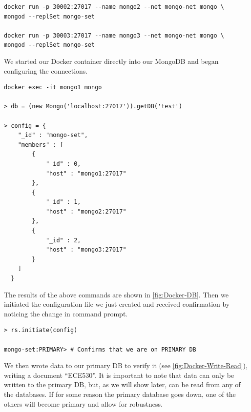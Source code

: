 \documentclass{article}
\begin{document}
\begin{tcolorbox}[colback=CrispBlue!5!white,colframe=CrispBlue!75!black,title=Create secondary MongoDB images]    
\begin{verbatim}    
docker run -p 30002:27017 --name mongo2 --net mongo-net mongo \
mongod --replSet mongo-set

docker run -p 30003:27017 --name mongo3 --net mongo-net mongo \
mongod --replSet mongo-set
\end{verbatim}
\end{tcolorbox}

\newpage

We started our Docker container directly into our MongoDB and began configuring the connections.
\begin{tcolorbox}[colback=CrispBlue!5!white,colframe=CrispBlue!75!black,title=Connect to \texttt{mongo1} and configure it to be the primary]
\begin{verbatim}
docker exec -it mongo1 mongo

> db = (new Mongo('localhost:27017')).getDB('test')

> config = {
  	"_id" : "mongo-set",
  	"members" : [
  		{
  		    "_id" : 0,
  		    "host" : "mongo1:27017"
  		},
  		{
  		    "_id" : 1,
  		    "host" : "mongo2:27017"
  		},
  		{
  		    "_id" : 2,
  		    "host" : "mongo3:27017"
  		}
  	]
  }
\end{verbatim}
\end{tcolorbox}

The results of the above commands are shown in \autoref{fig:Docker-DB}. Then we initiated the configuration file we just created and received confirmation by noticing the change in command prompt.

\begin{tcolorbox}[colback=CrispBlue!5!white,colframe=CrispBlue!75!black,title=Initiate our replica set using our just created config file]
\begin{verbatim}
> rs.initiate(config)

mongo-set:PRIMARY> # Confirms that we are on PRIMARY DB
\end{verbatim}
\end{tcolorbox}

We then wrote data to our primary DB to verify it (see \autoref{fig:Docker-Write-Read}), writing a document ``ECE530''. It is important to note that data can only be written to the primary DB, but, as we will show later, can be read from any of the databases. If for some reason the primary database goes down, one of the others will become primary and allow for robustness.
\end{document}
